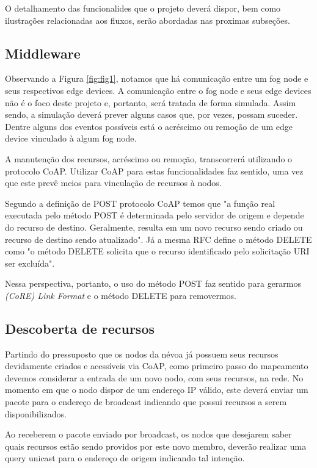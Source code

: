 O detalhamento das funcionalides que o projeto deverá dispor, bem como ilustrações relacionadas aos fluxos, serão abordadas nas proximas subseções.



\subsection{Middleware}

Observando a Figura \ref{fig:fig1}, notamos que há comunicação entre um fog node e seus respectivos edge devices.
A comunicação entre o fog node e seus edge devices não é o foco deste projeto e, portanto, será tratada de forma simulada.
Assim sendo, a simulação deverá prever alguns casos que, por vezes, possam suceder. Dentre alguns dos eventos possíveis está 
o acréscimo ou remoção de um edge device vinculado à algum fog node.

A manutenção dos recursos, acréscimo ou remoção, transcorrerá utilizando o protocolo CoAP.
Utilizar CoAP para estas funcionalidades faz sentido, uma vez que este prevê meios para vinculação de recursos à nodos.

Segundo a definição de POST protocolo CoAP temos que "a função real executada pelo método POST é determinada pelo servidor de origem e depende do recurso de destino.
Geralmente, resulta em um novo recurso sendo criado ou recurso de destino sendo atualizado"\cite{rfc7252}.
Já a mesma RFC define o método DELETE como "o método DELETE solicita que o recurso identificado pelo solicitação URI ser excluída"\cite{rfc7252}.

Nessa perspectiva, portanto, o uso do método POST faz sentido para gerarmos \textit{(CoRE) Link Format} e o método DELETE para removermos.


\subsection{Descoberta de recursos}


Partindo do pressuposto que os nodos da névoa já possuem seus recursos devidamente criados e acessíveis via CoAP,
como primeiro passo do mapeamento devemos considerar a entrada de um novo nodo, com seus recursos, na rede.
No momento em que o nodo dispor de um endereço IP válido, este deverá enviar um pacote para o endereço de broadcast indicando que possui recursos a serem disponibilizados.

Ao receberem o pacote enviado por broadcast, os nodos que desejarem saber quais recursos estão sendo providos por este novo membro, deverão realizar uma query
unicast para o endereço de origem indicando tal intenção.

